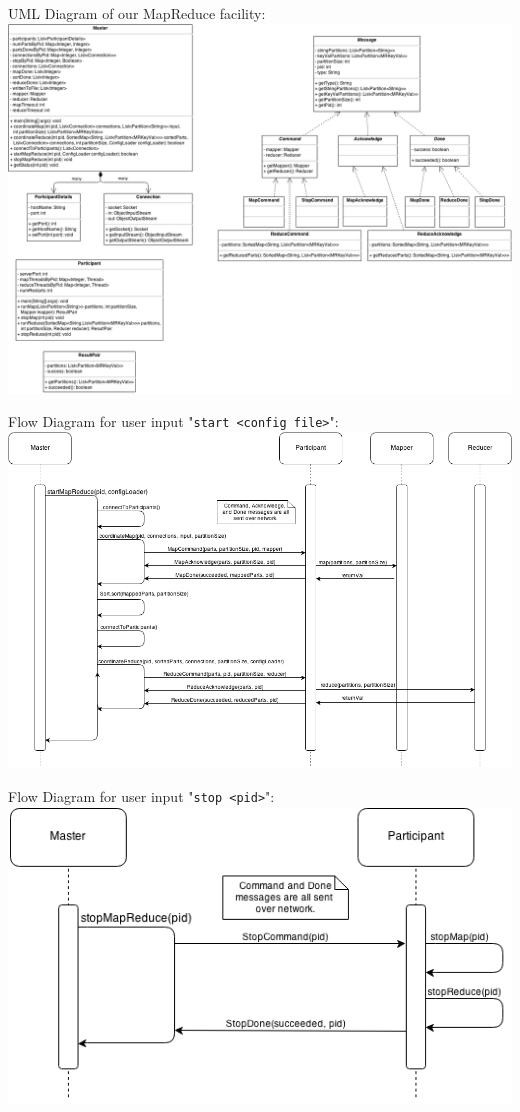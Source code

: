 \documentclass[12pt]{article}
\begin{document}
UML Diagram of our MapReduce facility: \\
\includegraphics[scale=.35]{MapReduce_UML.png}

\newpage
Flow Diagram for user input "\verb|start <config file>|": \\
\includegraphics[scale=.5]{MapReduce_start.png}

Flow Diagram for user input "\verb|stop <pid>|": \\
\includegraphics[scale=.7]{MapReduce_stop.png}
\end{document}
